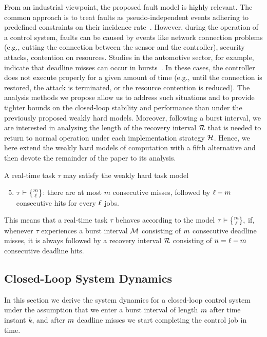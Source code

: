 From an industrial viewpoint, the proposed fault model is highly
relevant. The common approach is to treat faults as pseudo-independent 
events adhering to predefined constraints on their incidence 
rate~\cite{reliabook,montgomery2009introduction, Teich:2017}. However, during the operation of a control system, faults can be 
caused by events like network connection problems (e.g., cutting the
connection between the sensor and the controller), security attacks, contention on resources. Studies in the automotive sector, for example, indicate that deadline misses can occur in bursts~\cite{Quinton:2014,Xu:2015}. In these cases, the controller does not 
execute properly for a given amount of time (e.g., until the connection is restored, the attack is terminated, or the resource contention is reduced). The analysis 
methods we propose allow us to address such situations and
to provide tighter bounds on the closed-loop stability and performance 
than under the previously proposed weakly hard models. Moreover,
following a burst interval, we are interested in analysing the 
length of the recovery interval $\mathcal{R}$ that is needed to return 
to normal operation under each implementation strategy $\mathcal{H}$. 
Hence, we here extend the weakly hard models of computation with a 
fifth alternative and then devote the remainder of the paper to its analysis.
 
\begin{definition}
    \label{def:task-model}
    A real-time task $\tau$ may satisfy the weakly hard task model
    \begin{enumerate}[label=(\roman*)]
        \setcounter{enumi}{4}
        \item $\tau \vdash \genfrac{\{}{\}}{0pt}{}{\nummisses}{\numtotalanalysed}$: there are at most $m$ consecutive misses, followed by $\ell-m$ consecutive hits for every $\ell$ jobs.
    \end{enumerate}
    This means that a real-time task $\tau$ behaves according to the model
%
$
\tau \vdash
\genfrac{\{}{\}}{0pt}{}{\nummisses}{\numtotalanalysed},
$
%
if, whenever $\tau$ experiences a burst interval $\mathcal{M}$ consisting of $m$
consecutive deadline misses, it is always followed by a recovery interval
$\mathcal{R}$ consisting of $n=\ell-m$ consecutive deadline
hits.
\end{definition}

\subsection{Closed-Loop System Dynamics}%
\label{sec:derivation}
In this section we derive the system dynamics for a closed-loop control system under the assumption that we enter a burst interval of length $m$ after time instant $k$, and after $m$ deadline misses we start completing the control job in time.

